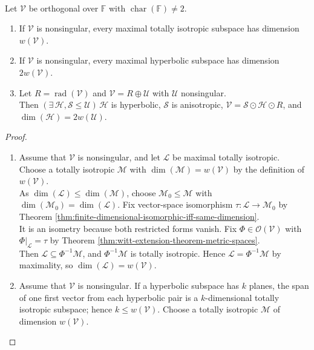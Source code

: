 \begin{theorem} \label{thm:orthogonal-witt-index-and-anisotropic-decomposition} \\
Let $\mathcal{V}$ be orthogonal over $\mathbb{F}$ with $\operatorname{char}(\mathbb{F})\neq2$.
\begin{enumerate}[label=(\roman*)]
\setlength{\itemsep}{0pt}
\item If $\mathcal{V}$ is nonsingular, every maximal totally isotropic subspace has dimension $w(\mathcal{V})$.
\item If $\mathcal{V}$ is nonsingular, every maximal hyperbolic subspace has dimension $2w(\mathcal{V})$.
\item Let $R=\operatorname{rad}(\mathcal{V})$ and $\mathcal{V}=R\oplus\mathcal{U}$ with $\mathcal{U}$ nonsingular.\\
Then $(\exists\,\mathcal{H},\mathcal{S}\leq\mathcal{U})\,\mathcal{H}$ is hyperbolic, $\mathcal{S}$ is anisotropic, $\mathcal{V}=\mathcal{S}\odot\mathcal{H}\odot R$, and $\dim(\mathcal{H})=2w(\mathcal{U})$.
\end{enumerate}
\begin{proof}
\begin{enumerate}[label=(\roman*)]
\setlength{\itemsep}{0pt}
\item[$(i)$] Assume that $\mathcal{V}$ is nonsingular, and let $\mathcal{L}$ be maximal totally isotropic.\\
Choose a totally isotropic $\mathcal{M}$ with $\dim(\mathcal{M})=w(\mathcal{V})$ by the definition of $w(\mathcal{V})$.\\
As $\dim(\mathcal{L})\leq\dim(\mathcal{M})$, choose $\mathcal{M}_0\leq\mathcal{M}$ with $\dim(\mathcal{M}_0)=\dim(\mathcal{L})$. Fix vector-space isomorphism $\tau:\mathcal{L}\to\mathcal{M}_0$ by Theorem \ref{thm:finite-dimensional-isomorphic-iff-same-dimension}.\\
It is an isometry because both restricted forms vanish. Fix $\Phi\in\mathcal{O}(\mathcal{V})$ with $\Phi|_{\mathcal{L}}=\tau$ by Theorem \ref{thm:witt-extension-theorem-metric-spaces}.\\
Then $\mathcal{L}\subseteq\Phi^{-1}\mathcal{M}$, and $\Phi^{-1}\mathcal{M}$ is totally isotropic. Hence $\mathcal{L}=\Phi^{-1}\mathcal{M}$ by maximality, so $\dim(\mathcal{L})=w(\mathcal{V})$.
\item[$(ii)$] Assume that $\mathcal{V}$ is nonsingular. If a hyperbolic subspace has $k$ planes, the span of one first vector from each hyperbolic pair is a $k$-dimensional totally isotropic subspace; hence $k\leq w(\mathcal{V})$. Choose a totally isotropic $\mathcal{M}$ of dimension $w(\mathcal{V})$.\\

\end{enumerate}
\end{proof}
\end{theorem}
